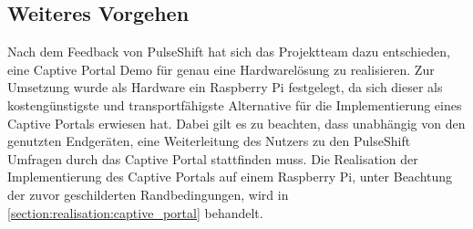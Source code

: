 \subsection{Weiteres Vorgehen}
Nach dem Feedback von PulseShift hat sich das Projektteam dazu entschieden, eine Captive Portal Demo für genau eine Hardwarelösung zu realisieren. Zur Umsetzung wurde als Hardware ein Raspberry Pi festgelegt, da sich dieser als kostengünstigste und transportfähigste Alternative für die Implementierung eines Captive Portals erwiesen hat. Dabei gilt es zu beachten, dass unabhängig von den genutzten Endgeräten, eine Weiterleitung des Nutzers zu den PulseShift Umfragen durch das Captive Portal stattfinden muss. Die Realisation der Implementierung des Captive Portals auf einem Raspberry Pi, unter Beachtung der zuvor geschilderten Randbedingungen, wird in \vref{section:realisation:captive_portal} behandelt.

